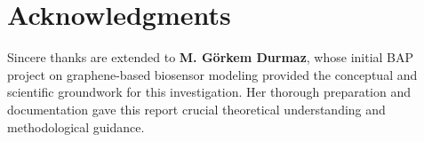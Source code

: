 \documentclass[12pt,a4paper]{report}
\begin{document}
\chapter*{Acknowledgments}


Sincere thanks are extended to \textbf{M. Görkem Durmaz}, whose initial BAP project on graphene-based biosensor modeling provided the conceptual and scientific groundwork for this investigation. Her thorough preparation and documentation gave this report crucial theoretical understanding and methodological guidance.  
\end{document}

